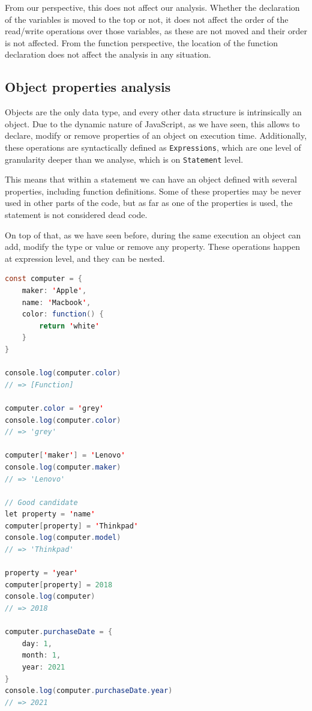 \documentclass{uvamscse}
\begin{document}
From our perspective, this does not affect our analysis. Whether the declaration of the variables is moved to the top or not, it does not affect the order of the read/write operations over those variables, as these are not moved and their order is not affected. From the function perspective, the location of the function declaration does not affect the analysis in any situation.

\subsection{Object properties analysis}
Objects are the only data type, and every other data structure is intrinsically an object. Due to the dynamic nature of JavaScript, as we have seen, this allows to declare, modify or remove properties of an object on execution time. Additionally, these operations are syntactically defined as \texttt{Expressions}, which are one level of granularity deeper than we analyse, which is on \texttt{Statement} level.

This means that within a statement we can have an object defined with several properties, including function definitions. Some of these properties may be never used in other parts of the code, but as far as one of the properties is used, the statement is not considered dead code.

On top of that, as we have seen before, during the same execution an object can add, modify the type or value or remove any property. These operations happen at expression level, and they can be nested.

\begin{lstlisting}[language=Java, caption=Example of property dynamism]
const computer = {
	maker: 'Apple',
	name: 'Macbook',
	color: function() {
		return 'white'
	}
}

console.log(computer.color)
// => [Function]

computer.color = 'grey'
console.log(computer.color)
// => 'grey'

computer['maker'] = 'Lenovo'
console.log(computer.maker)
// => 'Lenovo'

// Good candidate
let property = 'name'
computer[property] = 'Thinkpad'
console.log(computer.model)
// => 'Thinkpad'

property = 'year'
computer[property] = 2018
console.log(computer)
// => 2018

computer.purchaseDate = {
    day: 1,
    month: 1,
    year: 2021
}
console.log(computer.purchaseDate.year)
// => 2021
\end{lstlisting}
\end{document}
